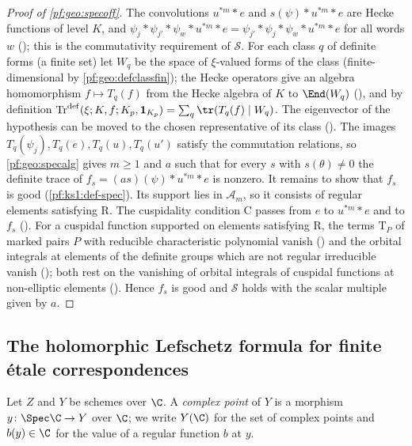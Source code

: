 \begin{proof}[Proof of \cref{pf:geo:specoff}]
The convolutions $u^{*m}*e$ and $s(\psi)*u^{*m}*e$ are Hecke functions of level $K$, and $\psi_j*\psi_{j'}*\psi_w*u^{*m}*e=\psi_{j'}*\psi_j*\psi_w*u^{*m}*e$
for all words $w$ (); this is the commutativity requirement of $\mathcal S$. For each class $q$ of
definite forms (a finite set) let $W_q$ be the space of $\xi$-valued forms of the class (finite-dimensional by \cref{pf:geo:defclassfin}); the
Hecke operators give an algebra homomorphism $f\mapsto T_q(f)$ from the Hecke algebra of $K$ to $\End(W_q)$
(), and by definition $\mathrm{Tr}^{\mathrm{def}}(\xi;K,f;K_p,\mathbf 1_{K_p})=\sum_q\tr(T_q(f)\mid W_q)$. The
eigenvector of the hypothesis can be moved to the chosen representative of its class (). The
images $T_q(\psi_j),T_q(e),T_q(u),T_q(u')$ satisfy the commutation relations, so \cref{pf:geo:specalg} gives $m\ge1$ and $a$ such that for
every $s$ with $s(\theta)\ne0$ the definite trace of $f_s=(as)(\psi)*u^{*m}*e$ is nonzero. It remains to show that $f_s$ is good
(\cref{pf:ks1:def-spec}). Its support lies in $\mathcal A_m$, so it consists of regular elements satisfying $\mathrm R$. The cuspidality condition
$\mathrm C$ passes from $e$ to $u^{*m}*e$ and to $f_s$ (). For a cuspidal function supported on
elements satisfying $\mathrm R$, the terms $\mathrm T_P$ of marked pairs $P$ with reducible characteristic polynomial vanish
() and the orbital integrals at elements of the definite groups which are not regular irreducible
vanish (); both rest on the vanishing of orbital integrals of cuspidal functions at non-elliptic
elements (). Hence $f_s$ is good and $\mathcal S$ holds with the scalar multiple
given by $a$.
\end{proof}

\subsection{The holomorphic Lefschetz formula for finite \'etale correspondences}\label{sec:pf:geo:hlf}

Let $Z$ and $Y$ be schemes over $\C$. A \emph{complex point} of $Y$ is a morphism $y\colon\Spec\C\to Y$ over $\C$; we write $Y(\C)$ for
the set of complex points and $b(y)\in\C$ for the value of a regular function $b$ at $y$.

